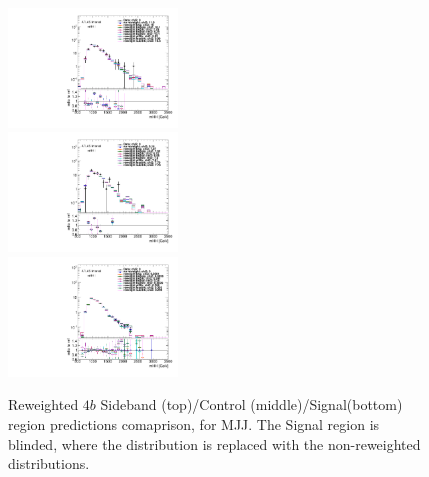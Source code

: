 \begin{figure}[htbp!]
\begin{center}
\includegraphics[width=0.4\textwidth,angle=-90]{figures/boosted/AppendixReweight/Compare/Data_FourTag_Sideband_directcompare_mHH_l_1.pdf}\\
\includegraphics[width=0.4\textwidth,angle=-90]{figures/boosted/AppendixReweight/Compare/Data_FourTag_Control_directcompare_mHH_l_1.pdf}\\
\includegraphics[width=0.4\textwidth,angle=-90]{figures/boosted/AppendixReweight/Compare/Data_FourTag_Signal_directcompare_mHH_l_1.pdf}
\caption{Reweighted $4b$ Sideband (top)/Control (middle)/Signal(bottom) region predictions comaprison, for MJJ. The Signal region is blinded, where the distribution is replaced with the non-reweighted distributions.}
\label{fig:app-rw-comp-4b}
\end{center}
\end{figure}

